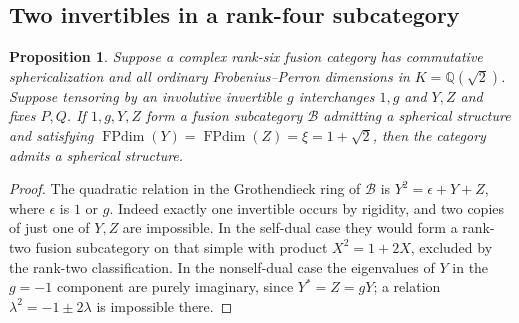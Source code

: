 \documentclass[11pt,reqno]{amsart}
\newtheorem{proposition}[theorem]{Proposition}
\theoremstyle{remark}\newtheorem{remark}[theorem]{Remark}
\numberwithin{equation}{section}
\begin{document}
\subsection{Two invertibles in a rank-four subcategory}
\begin{proposition}\label{prop:folded-silver-descent}
Suppose a complex rank-six fusion category has commutative sphericalization and all ordinary Frobenius--Perron dimensions in $K=\mathbb Q(\sqrt2)$. Suppose tensoring by an involutive invertible $g$ interchanges $1,g$ and $Y,Z$ and fixes $P,Q$. If $1,g,Y,Z$ form a fusion subcategory $\mathcal B$ admitting a spherical structure and satisfying $\operatorname{FPdim}(Y)=\operatorname{FPdim}(Z)=\xi=1+\sqrt2$, then the category admits a spherical structure.
\end{proposition}
\begin{proof}
The quadratic relation in the Grothendieck ring of $\mathcal B$ is $Y^2=\epsilon+Y+Z$, where $\epsilon$ is $1$ or $g$. Indeed exactly one invertible occurs by rigidity, and two copies of just one of $Y,Z$ are impossible. In the self-dual case they would form a rank-two fusion subcategory on that simple with product $X^2=1+2X$, excluded by the rank-two classification. In the nonself-dual case the eigenvalues of $Y$ in the $g=-1$ component are purely imaginary, since $Y^*=Z=gY$; a relation $\lambda^2=-1\pm2\lambda$ is impossible there.


\end{proof}
\end{document}
